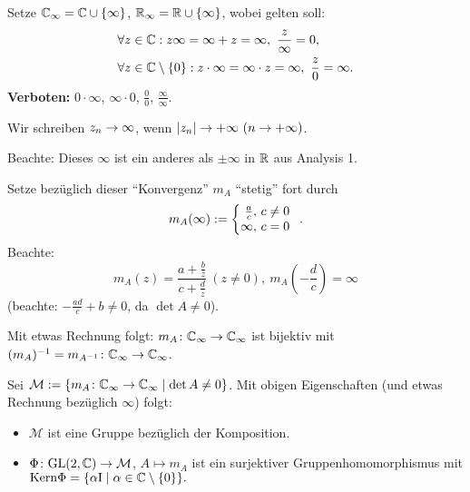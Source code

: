 \documentclass[a4paper,twoside,DIV15,BCOR12mm]{scrbook}
\begin{document}
\begin{dfn} \label{dfn1.10}
  Setze $\mathbb{C}_\infty = \mathbb{C} \cup \{\infty\}$, $\mathbb{R}_\infty = \mathbb{R} \cup \{\infty\}$, wobei gelten soll:
\begin{eqnarray*}
&\forall z\in\mathbb{C}: z\infty = \infty + z = \infty,\ \frac{z}{\infty} = 0,\\
&\forall z\in\mathbb{C}\setminus \{0\}: z\cdot\infty = \infty\cdot z = \infty,\ \frac{z}{0} = \infty.
\end{eqnarray*}
\textbf{Verboten:} $0\cdot\infty$, $\infty\cdot 0$, $\frac{0}{0}$, $\frac{\infty}{\infty}$.

\noindent Wir schreiben $z_n \rightarrow \infty$, wenn $\abs{z_n} \ra +\infty\ (n\ra+\infty)$.

\noindent Beachte: Dieses $\infty$ ist ein anderes als $\pm\infty$ in $\mathbb{R}$ aus Analysis 1.
\end{dfn}

Setze bezüglich dieser "`Konvergenz"' $m_A$ "`stetig"' fort durch
\[m_A (\infty) \da \left\{\!\!\!\begin{array}{r @{,\ } l}\frac{a}{c}&c\neq 0\\\infty&c=0\end{array}\right..\]
Beachte:
\[m_A(z)=\frac{a+\frac{b}{z}}{c+\frac{d}{z}}\ (z\neq 0),\ m_A\left(-\frac{d}{c}\right) = \infty\]
(beachte: $-\frac{ad}{c} + b\neq 0$, da $\det A\neq 0$).

Mit etwas Rechnung folgt: $m_A\colon\mathbb{C}_\infty\rightarrow\mathbb{C}_\infty$ ist bijektiv mit $(m_A)^{-1} = m_{A^{-1}}\colon\mathbb{C}_\infty\rightarrow\mathbb{C}_\infty$.

Sei $\mathcal{M}:=\{m_A\colon\mathbb{C}_\infty\rightarrow\mathbb{C}_\infty\mid\det A\neq 0\}$. Mit obigen Eigenschaften (und etwas Rechnung bezüglich $\infty$) folgt:
\begin{itemize}
\item $\mathcal{M}$ ist eine Gruppe bezüglich der Komposition.
\item $\Phi\colon \mathrm{GL}(2,\mathbb{C})\rightarrow\mathcal{M}$, $A\mapsto m_A$ ist ein surjektiver Gruppenhomomorphismus mit
  $\mathrm{Kern }\Phi = \{\alpha \mathrm{I} \mid \alpha\in\mathbb{C}\setminus\{0\}\}.$
\end{itemize}
\end{document}

